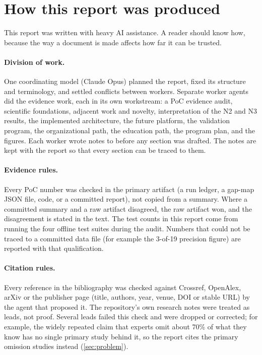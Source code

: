 \section{How this report was produced}\label{app:method}

This report was written with heavy AI assistance. A reader should know how,
because the way a document is made affects how far it can be trusted.

\paragraph{Division of work.} One coordinating model (Claude Opus) planned
the report, fixed its structure and terminology, and settled conflicts between
workers. Separate worker agents did the evidence work, each in its own
workstream: a PoC evidence audit, scientific foundations, adjacent work and
novelty, interpretation of the N2 and N3 results, the implemented
architecture, the future platform, the validation program, the organizational
path, the education path, the program plan, and the figures. Each worker
wrote notes to  before any section was drafted. The notes
are kept with the report so that every section can be traced to them.

\paragraph{Evidence rules.} Every PoC number was checked in the primary
artifact (a run ledger, a gap-map JSON file, code, or a committed report),
not copied from a summary. Where a committed summary and a raw artifact
disagreed, the raw artifact won, and the disagreement is stated in the text.
The test counts in this report come from running the four offline test
suites during the audit. Numbers that could not be traced to a committed
data file (for example the 3-of-19 precision figure) are reported with that
qualification.

\paragraph{Citation rules.} Every reference in the bibliography was checked
against Crossref, OpenAlex, arXiv or the publisher page (title, authors, year,
venue, DOI or stable URL) by the agent that proposed it. The repository's own
research notes were treated as leads, not proof. Several leads failed this
check and were dropped or corrected; for example, the widely repeated claim
that experts omit about 70\% of what they know has no single primary study
behind it, so the report cites the primary omission studies instead
(\cref{sec:problem}).


